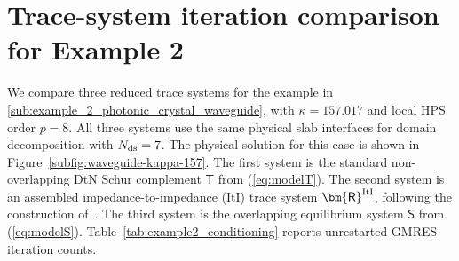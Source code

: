\documentclass[final,onefignum,onetabnum]{siamart250211}
\newcommand{\mtx}[1]{\bm{\mathsf{#1}}}
\theoremstyle{definition}
\begin{document}
\section{Trace-system iteration comparison for Example 2}\label{app:example2_conditioning}
We compare three reduced trace systems for the example in \ref{sub:example_2_photonic_crystal_waveguide}, with $\kappa=157.017$ and local HPS order $p=8$.  All three systems use the same physical slab interfaces for domain decomposition with $N_{\rm ds} = 7$.  The physical solution for this case is shown in Figure~\ref{subfig:waveguide-kappa-157}.  The first system is the standard non-overlapping DtN Schur complement $\mtx{T}$ from (\ref{eq:modelT}).  The second system is an assembled impedance-to-impedance (ItI) trace system $\mtx{R}^{\rm ItI}$, following the construction of~\cite{2013_martinsson_ItI}.  The third system is the overlapping equilibrium system $\mtx{S}$ from (\ref{eq:modelS}).  Table~\ref{tab:example2_conditioning} reports %
unrestarted GMRES iteration counts.
\end{document}
